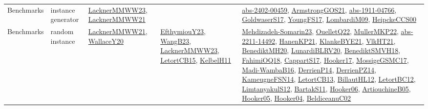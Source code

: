 {\begin{longtable}{llp{6cm}p{6cm}p{6cm}}
Benchmarks & instance generator & \href{articles/LacknerMMWW23.pdf}{LacknerMMWW23}\cite{LacknerMMWW23}, \href{papers/LacknerMMWW21.pdf}{LacknerMMWW21}\cite{LacknerMMWW21} &  & \href{articles/abs-2402-00459.pdf}{abs-2402-00459}\cite{abs-2402-00459}, \href{papers/ArmstrongGOS21.pdf}{ArmstrongGOS21}\cite{ArmstrongGOS21}, \href{articles/abs-1911-04766.pdf}{abs-1911-04766}\cite{abs-1911-04766}, \href{papers/GoldwaserS17.pdf}{GoldwaserS17}\cite{GoldwaserS17}, \href{papers/YoungFS17.pdf}{YoungFS17}\cite{YoungFS17}, \href{papers/LombardiM09.pdf}{LombardiM09}\cite{LombardiM09}, \href{articles/HeipckeCCS00.pdf}{HeipckeCCS00}\cite{HeipckeCCS00}\\
Benchmarks & random instance & \href{papers/LacknerMMWW21.pdf}{LacknerMMWW21}\cite{LacknerMMWW21}, \href{articles/WallaceY20.pdf}{WallaceY20}\cite{WallaceY20} & \href{papers/EfthymiouY23.pdf}{EfthymiouY23}\cite{EfthymiouY23}, \href{papers/WangB23.pdf}{WangB23}\cite{WangB23}, \href{articles/LacknerMMWW23.pdf}{LacknerMMWW23}\cite{LacknerMMWW23}, \href{articles/LetortCB15.pdf}{LetortCB15}\cite{LetortCB15}, \href{articles/KelbelH11.pdf}{KelbelH11}\cite{KelbelH11} & \href{papers/Mehdizadeh-Somarin23.pdf}{Mehdizadeh-Somarin23}\cite{Mehdizadeh-Somarin23}, \href{papers/OuelletQ22.pdf}{OuelletQ22}\cite{OuelletQ22}, \href{articles/MullerMKP22.pdf}{MullerMKP22}\cite{MullerMKP22}, \href{articles/abs-2211-14492.pdf}{abs-2211-14492}\cite{abs-2211-14492}, \href{papers/HanenKP21.pdf}{HanenKP21}\cite{HanenKP21}, \href{papers/KlankeBYE21.pdf}{KlankeBYE21}\cite{KlankeBYE21}, \href{articles/VlkHT21.pdf}{VlkHT21}\cite{VlkHT21}, \href{articles/BenediktMH20.pdf}{BenediktMH20}\cite{BenediktMH20}, \href{articles/LunardiBLRV20.pdf}{LunardiBLRV20}\cite{LunardiBLRV20}, \href{papers/BenediktSMVH18.pdf}{BenediktSMVH18}\cite{BenediktSMVH18}, \href{articles/FahimiOQ18.pdf}{FahimiOQ18}\cite{FahimiOQ18}, \href{papers/CappartS17.pdf}{CappartS17}\cite{CappartS17}, \href{papers/Hooker17.pdf}{Hooker17}\cite{Hooker17}, \href{papers/MossigeGSMC17.pdf}{MossigeGSMC17}\cite{MossigeGSMC17}, \href{papers/Madi-WambaB16.pdf}{Madi-WambaB16}\cite{Madi-WambaB16}, \href{papers/DerrienP14.pdf}{DerrienP14}\cite{DerrienP14}, \href{papers/DerrienPZ14.pdf}{DerrienPZ14}\cite{DerrienPZ14}, \href{articles/KameugneFSN14.pdf}{KameugneFSN14}\cite{KameugneFSN14}, \href{papers/LetortCB13.pdf}{LetortCB13}\cite{LetortCB13}, \href{papers/BillautHL12.pdf}{BillautHL12}\cite{BillautHL12}, \href{papers/LetortBC12.pdf}{LetortBC12}\cite{LetortBC12}, \href{articles/LimtanyakulS12.pdf}{LimtanyakulS12}\cite{LimtanyakulS12}, \href{articles/BartakS11.pdf}{BartakS11}\cite{BartakS11}, \href{articles/Hooker06.pdf}{Hooker06}\cite{Hooker06}, \href{papers/ArtiouchineB05.pdf}{ArtiouchineB05}\cite{ArtiouchineB05}, \href{articles/Hooker05.pdf}{Hooker05}\cite{Hooker05}, \href{papers/Hooker04.pdf}{Hooker04}\cite{Hooker04}, \href{papers/BeldiceanuC02.pdf}{BeldiceanuC02}\cite{BeldiceanuC02}\\

\end{longtable}}
